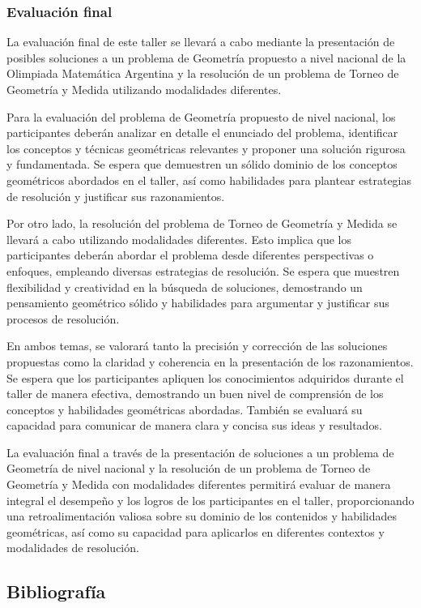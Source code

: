 \subsubsection{Evaluación final}

La evaluación final de este taller se llevará a cabo mediante la presentación de posibles soluciones a un problema de Geometría propuesto a nivel nacional de la Olimpiada Matemática Argentina y la resolución de un problema de Torneo de Geometría y Medida utilizando modalidades diferentes.

Para la evaluación del problema de Geometría propuesto de nivel nacional, los participantes deberán analizar en detalle el enunciado del problema, identificar los conceptos y técnicas geométricas relevantes y proponer una solución rigurosa y fundamentada. Se espera que demuestren un sólido dominio de los conceptos geométricos abordados en el taller, así como habilidades para plantear estrategias de resolución y justificar sus razonamientos. 

Por otro lado, la resolución del problema de Torneo de Geometría y Medida se llevará a cabo utilizando modalidades diferentes. Esto implica que los participantes deberán abordar el problema desde diferentes perspectivas o enfoques, empleando diversas estrategias de resolución. Se espera que muestren flexibilidad y creatividad en la búsqueda de soluciones, demostrando un pensamiento geométrico sólido y habilidades para argumentar y justificar sus procesos de resolución. 

En ambos temas, se valorará tanto la precisión y corrección de las soluciones propuestas como la claridad y coherencia en la presentación de los razonamientos. Se espera que los participantes apliquen los conocimientos adquiridos durante el taller de manera efectiva, demostrando un buen nivel de comprensión de los conceptos y habilidades geométricas abordadas. También se evaluará su capacidad para comunicar de manera clara y concisa sus ideas y resultados.

La evaluación final a través de la presentación de soluciones a un problema de Geometría de nivel nacional y la resolución de un problema de Torneo de Geometría y Medida con modalidades diferentes permitirá evaluar de manera integral el desempeño y los logros de los participantes en el taller, proporcionando una retroalimentación valiosa sobre su dominio de los contenidos y habilidades geométricas, así como su capacidad para aplicarlos en diferentes contextos y modalidades de resolución.

\subsection{Bibliografía}

\nocite{*}
\printbibliography[keyword={05}]